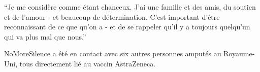 {“Je me considère comme étant chanceux. J'ai une famille et des amis, du soutien
et de l'amour - et beaucoup de détermination. C'est important d'être
reconnaissant de ce que qu'on a - et de se rappeler qu'il y a toujours quelqu'un
qui va plus mal que nous.”

NoMoreSilence a été en contact avec six autres personnes amputés au Royaume-Uni,
tous directement lié au vaccin AstraZeneca.

}
